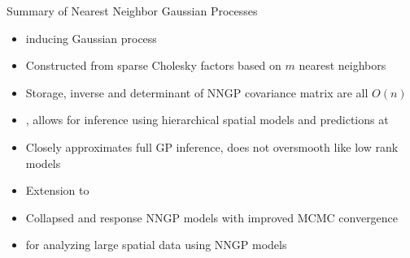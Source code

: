 
\begin{frame}{Summary of Nearest Neighbor Gaussian Processes}
\begin{itemize}
\item {} inducing Gaussian process
\item Constructed from sparse Cholesky factors based on $m$ nearest neighbors
\item {} Storage, inverse and determinant of NNGP covariance matrix are all $O(n)$
\item {}, allows for inference using hierarchical spatial models and predictions at 
\item Closely approximates full GP inference, does not oversmooth like low rank models
\item Extension to 
\item Collapsed and response NNGP models with improved MCMC convergence
\item {} for analyzing large spatial data using NNGP models
\end{itemize}
\end{frame}


